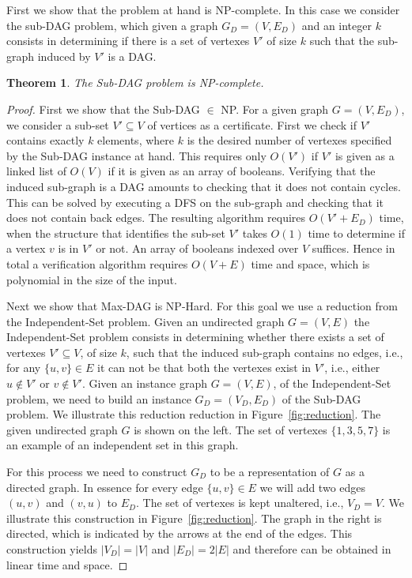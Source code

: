 \documentclass[a4paper]{article}
\newtheorem{theorem}{Theorem}
\begin{document}
First we show that the problem at hand is NP-complete. In this case we
consider the sub-DAG problem, which given a graph $G_D = (V, E_D)$ and an
integer $k$ consists in determining if there is a set of vertexes $V'$ of
size $k$ such that the sub-graph induced by $V'$ is a DAG.
%
\begin{theorem}
  The Sub-DAG problem is NP-complete.
\label{teo:NPC}
\end{theorem}
%
\begin{proof}
  First we show that the Sub-DAG $\in$ NP. For a given graph
  $G = (V, E_D)$, we consider a sub-set $V' \subseteq V$ of vertices as a
  certificate. First we check if $V'$ contains exactly $k$ elements, where
  $k$ is the desired number of vertexes specified by the Sub-DAG instance
  at hand. This requires only $O(V')$ if $V'$ is given as a linked list of
  $O(V)$ if it is given as an array of booleans. Verifying that the induced
  sub-graph is a DAG amounts to checking that it does not contain
  cycles. This can be solved by executing a DFS on the sub-graph and
  checking that it does not contain back edges. The resulting algorithm
  requires $O(V'+E_D)$ time, when the structure that identifies the sub-set
  $V'$ takes $O(1)$ time to determine if a vertex $v$ is in $V'$ or not. An
  array of booleans indexed over $V$ suffices. Hence in total a
  verification algorithm requires $O(V + E)$ time and space, which is
  polynomial in the size of the input.

  Next we show that Max-DAG is NP-Hard. For this goal we use a
  reduction from the Independent-Set problem. Given an undirected graph
  $G = (V, E)$ the Independent-Set problem consists in determining whether
  there exists a set of vertexes $V' \subseteq V$, of size $k$, such that
  the induced sub-graph contains no edges, i.e., for any $\{u, v\} \in E$
  it can not be that both the vertexes exist in $V'$, i.e., either
  $u \notin V'$ or $v \notin V'$. Given an instance graph $G=(V, E)$, of
  the Independent-Set problem, we need to build an instance
  $G_D = (V_D, E_D)$ of the Sub-DAG problem. We illustrate this reduction
  reduction in Figure~\ref{fig:reduction}. The given undirected graph $G$
  is shown on the left. The set of vertexes $\{1,3,5,7\}$ is an example of
  an independent set in this graph.

  For this process we need to construct $G_D$ to be a representation of $G$
  as a directed graph. In essence for every edge $\{u,v\} \in E$ we will
  add two edges $(u,v)$ and $(v,u)$ to $E_D$. The set of vertexes is kept
  unaltered, i.e., $V_D=V$.  We illustrate this construction in
  Figure~\ref{fig:reduction}. The graph in the right is directed, which is
  indicated by the arrows at the end of the edges. This construction yields
  $|V_D| = |V|$ and $|E_D| = 2 |E|$ and therefore can be obtained in linear
  time and space.


\end{proof}
\end{document}
